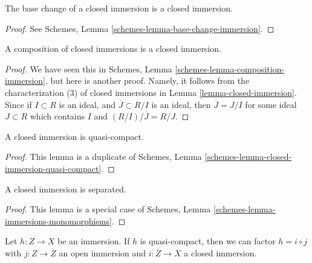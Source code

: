 \begin{lemma}
\label{lemma-base-change-closed-immersion}
The base change of a closed immersion is a closed immersion.
\end{lemma}

\begin{proof}
See Schemes, Lemma \ref{schemes-lemma-base-change-immersion}.
\end{proof}

\begin{lemma}
\label{lemma-composition-closed-immersion}
A composition of closed immersions is a closed immersion.
\end{lemma}

\begin{proof}
We have seen this in
Schemes, Lemma \ref{schemes-lemma-composition-immersion},
but here is another
proof. Namely, it follows from the characterization (3) of closed immersions
in Lemma \ref{lemma-closed-immersion}. Since if $I \subset R$
is an ideal, and $\overline{J} \subset R/I$ is an ideal, then
$\overline{J} = J/I$ for some ideal $J \subset R$ which contains
$I$ and $(R/I)/\overline{J} = R/J$.
\end{proof}

\begin{lemma}
\label{lemma-closed-immersion-quasi-compact}
A closed immersion is quasi-compact.
\end{lemma}

\begin{proof}
This lemma is a duplicate of
Schemes, Lemma \ref{schemes-lemma-closed-immersion-quasi-compact}.
\end{proof}

\begin{lemma}
\label{lemma-closed-immersion-separated}
A closed immersion is separated.
\end{lemma}

\begin{proof}
This lemma is a special case of
Schemes, Lemma \ref{schemes-lemma-immersions-monomorphisms}.
\end{proof}

\begin{lemma}
\label{lemma-factor-quasi-compact-immersion}
Let $h : Z \to X$ be an immersion.
If $h$ is quasi-compact, then we can factor
$h = i \circ j$ with $j : Z \to \overline{Z}$ an
open immersion and $i : \overline{Z} \to X$ a closed immersion.
\end{lemma}

